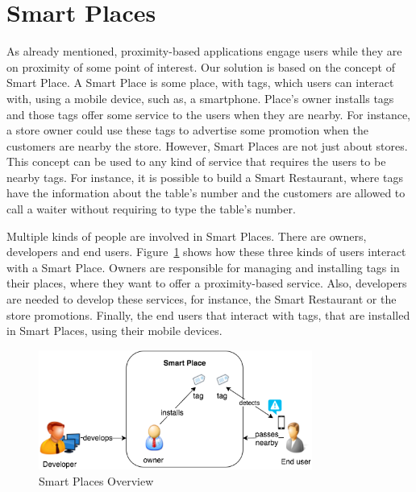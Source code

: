 \section{Smart Places}
\label{sec:background_smart_places}
As already mentioned, proximity-based applications engage users while they are on proximity of some point of interest.
Our solution is based on the concept of Smart Place.
A Smart Place is some place, with tags, which users can interact with, using a mobile device, such as, a smartphone.
Place's owner installs tags and those tags offer some service to the users when they are nearby.
For instance, a store owner could use these tags to advertise some promotion when the customers are nearby the store.
However, Smart Places are not just about stores.
This concept can be used to any kind of service that requires the users to be nearby tags.
For instance, it is possible to build a Smart Restaurant, where tags have the information about the table's number and the customers are allowed to call a waiter without requiring to type the table's number.

Multiple kinds of people are involved in Smart Places.
There are owners, developers and end users.
Figure~\ref{fig:smart_places_overview} shows how these three kinds of users interact with a Smart Place.
Owners are responsible for managing and installing tags in their places, where they want to offer a proximity-based service.
Also, developers are needed to develop these services, for instance, the Smart Restaurant or the store promotions.
Finally, the end users that interact with tags, that are installed in Smart Places, using their mobile devices.

\begin{figure}[!ht]
  \centering
    \includegraphics[width=0.8\textwidth, keepaspectratio]{images/smart_places_overview}
    \caption[Smart Places Overview]{Smart Places Overview}
    \label{fig:smart_places_overview}
\end{figure}

